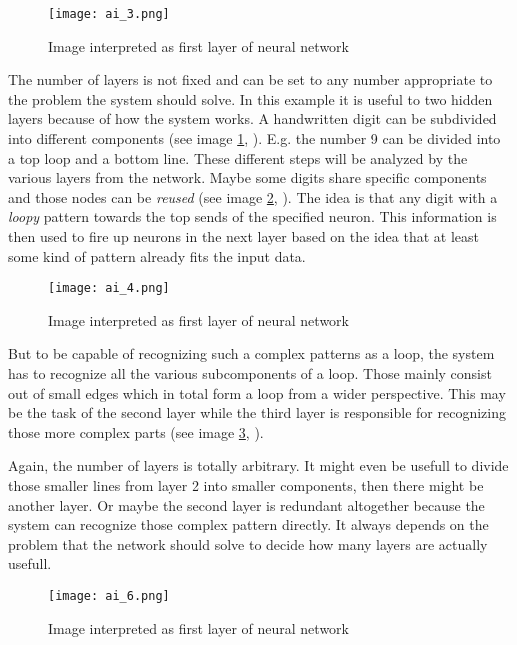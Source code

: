 \documentclass{article}
\newcommand{\lbl}[1]{(see image \ref{#1}, \textit{\nameref{#1}})}
\begin{document}
\begin{figure}[h]
\centering
\texttt{[image: ai\_3.png]}
\caption{Image interpreted as first layer of neural network}
\label{ai_3}
\end{figure}

The number of layers is not fixed and can be set to any number appropriate to the problem the system should solve. In this example it is useful to two hidden layers because of how the system works. A handwritten digit can be subdivided into different components \lbl{ai_3}. E.g. the number 9 can be divided into a top loop and a bottom line. These different steps will be analyzed by the various layers from the network. Maybe some digits share specific components and those nodes can be \textit{reused} \lbl{ai_4}. The idea is that any digit with a \textit{loopy} pattern towards the top sends of the specified neuron. This information is then used to fire up neurons in the next layer based on the idea that at least some kind of pattern already fits the input data.

\begin{figure}[h]
\centering
\texttt{[image: ai\_4.png]}
\caption{Image interpreted as first layer of neural network}
\label{ai_4}
\end{figure}

But to be capable of recognizing such a complex patterns as a loop, the system has to recognize all the various subcomponents of a loop. Those mainly consist out of small edges which in total form a loop from a wider perspective. This may be the task of the second layer while the third layer is responsible for recognizing those more complex parts \lbl{ai_6}. 

Again, the number of layers is totally arbitrary. It might even be usefull to divide those smaller lines from layer 2 into smaller components, then there might be another layer. Or maybe the second layer is redundant altogether because the system can recognize those complex pattern directly. It always depends on the problem that the network should solve to decide how many layers are actually usefull.

\begin{figure}[h]
\centering
\texttt{[image: ai\_6.png]}
\caption{Image interpreted as first layer of neural network}
\label{ai_6}
\end{figure}
\end{document}
